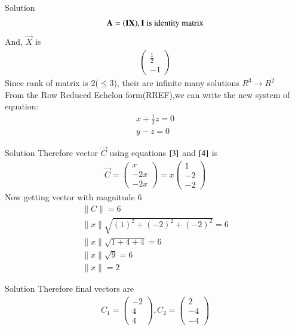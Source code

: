 \documentclass{beamer}
\begin{document}
\begin{frame}{Solution}
\begin{align}
\vec{A}=(\vec{I}\vec{X}), \text{\textbf{I} is identity matrix}
\end{align}
And, $\vec{X}$ is
\begin{align}
    \begin{pmatrix}\frac{1}{2}\\-1\end{pmatrix}
\end{align}
Since rank of matrix is 2($\leq 3$), their are infinite many solutions $R^3\rightarrow R^2$\\
From the Row Reduced Echelon form(RREF),we can write the new system of equation:
\begin{align}
    x+\frac{1}{2}z=0 \label{3} \\
    y-z=0 \label{4}
\end{align}
\end{frame}
\begin{frame}{Solution}
Therefore vector $\vec{C}$ using equations $\eqref{3}$ and $\eqref{4}$ is
\begin{align}
    \vec{C}=\begin{pmatrix}x\\-2x\\-2x\end{pmatrix}=x\begin{pmatrix}1\\-2\\-2\end{pmatrix}
\end{align}
Now getting vector with magnitude 6
\begin{align}
    \lVert C\rVert =6\\
    \lVert x\rVert \sqrt{(1)^2+(-2)^2+(-2)^2}=6\\
    \lVert x\rVert \sqrt{1+4+4}=6\\
    \lVert x\rVert \sqrt{9}=6\\
    \lVert x\rVert =2
\end{align}
\end{frame}
\begin{frame}{Solution}
Therefore final vectors are
\begin{align}
    C_1=\begin{pmatrix} -2\\4\\4 \end{pmatrix},
    C_2=\begin{pmatrix} 2\\-4\\-4 \end{pmatrix}
\end{align}
\end{frame}
\end{document}
